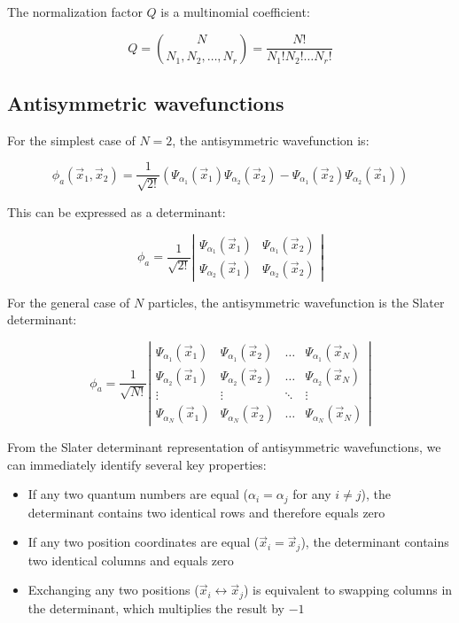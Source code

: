 \documentclass[italian]{HKNdocument}
\begin{document}
The normalization factor $Q$ is a multinomial coefficient:

\begin{equation}
Q=\binom{N}{N_1,N_2,\ldots,N_r}=\frac{N!}{N_1!N_2!\ldots N_r!}
\end{equation}

\subsection{Antisymmetric wavefunctions}
For the simplest case of $N=2$, the antisymmetric wavefunction is:

\begin{equation}
\phi_a(\vec{x}_1,\vec{x}_2)=\frac{1}{\sqrt{2!}}(\Psi_{\alpha_1}(\vec{x}_1)\Psi_{\alpha_2}(\vec{x}_2)-\Psi_{\alpha_1}(\vec{x}_2)\Psi_{\alpha_2}(\vec{x}_1))
\end{equation}

This can be expressed as a determinant:

\[
\phi_a=\frac{1}{\sqrt{2!}}\left|\begin{array}{ll}
\Psi_{\alpha_1}(\vec{x}_1) & \Psi_{\alpha_1}(\vec{x}_2) \\
\Psi_{\alpha_2}(\vec{x}_1) & \Psi_{\alpha_2}(\vec{x}_2)
\end{array}\right|
\]

For the general case of $N$ particles, the antisymmetric wavefunction is the Slater determinant:

\[
\phi_a=\frac{1}{\sqrt{N!}}\left|\begin{array}{cccc}
\Psi_{\alpha_1}(\vec{x}_1) & \Psi_{\alpha_1}(\vec{x}_2) & \ldots & \Psi_{\alpha_1}(\vec{x}_N) \\
\Psi_{\alpha_2}(\vec{x}_1) & \Psi_{\alpha_2}(\vec{x}_2) & \ldots & \Psi_{\alpha_2}(\vec{x}_N)\\
\vdots & \vdots & \ddots & \vdots\\
\Psi_{\alpha_N}(\vec{x}_1) & \Psi_{\alpha_N}(\vec{x}_2) & \ldots & \Psi_{\alpha_N}(\vec{x}_N)
\end{array}\right|
\]


From the Slater determinant representation of antisymmetric wavefunctions, we can immediately identify several key properties:

\begin{itemize}
  \item If any two quantum numbers are equal ($\alpha_i=\alpha_j$ for any $i\neq j$), the determinant contains two identical rows and therefore equals zero
  \item If any two position coordinates are equal ($\vec{x}_i=\vec{x}_j$), the determinant contains two identical columns and equals zero
  \item Exchanging any two positions ($\vec{x}_i \leftrightarrow \vec{x}_j$) is equivalent to swapping columns in the determinant, which multiplies the result by $-1$
\end{itemize}
\end{document}

